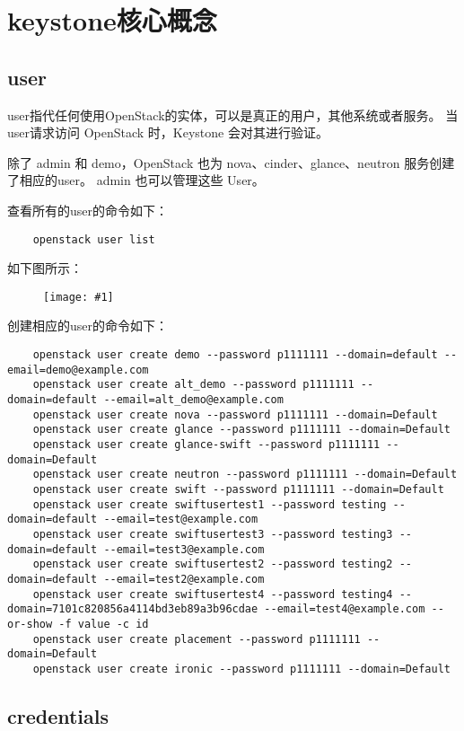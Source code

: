 \documentclass[a4paper,left=1.5cm,right=1.5cm,11pt]{article}
\newcommand{\fic}[1]{\begin{figure}[H]
		\center
		\texttt{[image: \#1]}
	\end{figure}}
\begin{document}
\tableofcontents

\clearpage

\section{keystone核心概念}
\subsection{user}
	user指代任何使用OpenStack的实体，可以是真正的用户，其他系统或者服务。
	当user请求访问 OpenStack 时，Keystone 会对其进行验证。\par

	除了 admin 和 demo，OpenStack 也为 nova、cinder、glance、neutron 服务创建了相应的user。 
	admin 也可以管理这些 User。\par

	查看所有的user的命令如下：
	\begin{lstlisting}
	openstack user list
	\end{lstlisting}

	如下图所示：
	\fic{2.png}

	创建相应的user的命令如下：
	\begin{lstlisting}
	openstack user create demo --password p1111111 --domain=default --email=demo@example.com
	openstack user create alt_demo --password p1111111 --domain=default --email=alt_demo@example.com
	openstack user create nova --password p1111111 --domain=Default
	openstack user create glance --password p1111111 --domain=Default
	openstack user create glance-swift --password p1111111 --domain=Default
	openstack user create neutron --password p1111111 --domain=Default
	openstack user create swift --password p1111111 --domain=Default
	openstack user create swiftusertest1 --password testing --domain=default --email=test@example.com
	openstack user create swiftusertest3 --password testing3 --domain=default --email=test3@example.com
	openstack user create swiftusertest2 --password testing2 --domain=default --email=test2@example.com
	openstack user create swiftusertest4 --password testing4 --domain=7101c820856a4114bd3eb89a3b96cdae --email=test4@example.com --or-show -f value -c id
	openstack user create placement --password p1111111 --domain=Default
	openstack user create ironic --password p1111111 --domain=Default
	\end{lstlisting}

\subsection{credentials}
\end{document}
